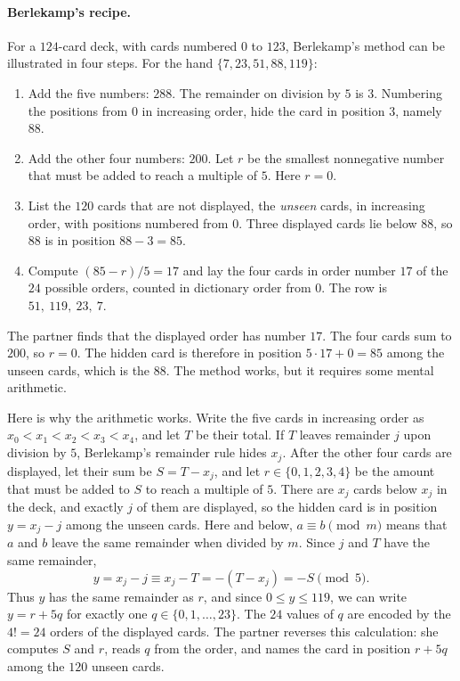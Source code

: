 \documentclass[11pt]{article}
\begin{document}
\paragraph{Berlekamp's recipe.} For a $124$-card deck, with cards numbered $0$ to $123$, Berlekamp's method can be illustrated in four steps. For the hand $\{7,23,51,88,119\}$:
\begin{enumerate}
\item Add the five numbers: $288$. The remainder on division by $5$ is $3$. Numbering the positions from $0$ in increasing order, hide the card in position $3$, namely $88$.
\item Add the other four numbers: $200$. Let $r$ be the smallest nonnegative number that must be added to reach a multiple of $5$. Here $r=0$.
\item 
List the $120$ cards that are not displayed, the \emph{unseen} cards, in increasing order, with positions numbered from $0$. Three displayed cards lie below $88$, so $88$ is in position $88-3=85$.
\item Compute $(85-r)/5=17$ and lay the four cards in order number $17$ of the $24$ possible orders, counted in dictionary order from $0$. The row is $51,\ 119,\ 23,\ 7$.
\end{enumerate}
The partner finds that the displayed order has number $17$. The four cards sum to $200$, so $r=0$. The hidden card is therefore in position $5\cdot17+0=85$ among the unseen cards, which is the $88$. The method works, but it requires some mental arithmetic.

Here is why the arithmetic works. Write the five cards in increasing order as $x_0<x_1<x_2<x_3<x_4$, and let $T$ be their total. If $T$ leaves remainder $j$ upon division by $5$, Berlekamp's remainder rule hides $x_j$. After the other four cards are displayed, let their sum be $S=T-x_j$, and let $r\in\{0,1,2,3,4\}$ be the amount that must be added to $S$ to reach a multiple of $5$. 
There are $x_j$ cards below $x_j$ in the deck, and exactly $j$ of them are displayed, so the hidden card is in position $y=x_j-j$ among the unseen cards. Here and below, $a\equiv b\pmod m$ means that $a$ and $b$ leave the same remainder when divided by $m$.
Since $j$ and $T$ have the same remainder,
\[
  y=x_j-j\equiv x_j-T=-(T-x_j)=-S\pmod5.
\]
Thus $y$ has the same remainder as $r$, and since $0\leq y\leq119$, we can write $y=r+5q$ for exactly one $q\in\{0,1,\ldots,23\}$. The $24$ values of $q$ are encoded by the $4!=24$ orders of the displayed cards. 
The partner reverses this calculation: she computes $S$ and $r$, reads $q$ from the order, and names the card in position $r+5q$ among the $120$ unseen cards.
\end{document}
